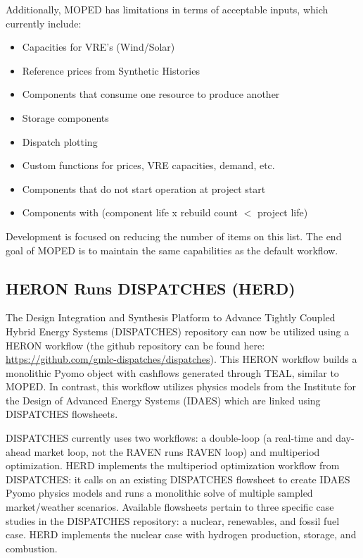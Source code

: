 Additionally, MOPED has limitations in terms of acceptable inputs, which currently include:
\begin{itemize}
    \item Capacities for VRE's (Wind/Solar)
    \item Reference prices from Synthetic Histories
    \item Components that consume one resource to produce another
    \item Storage components
    \item Dispatch plotting
    \item Custom functions for prices, VRE capacities, demand, etc.
    \item Components that do not start operation at project start
    \item Components with (component life x rebuild count $<$ project life)
\end{itemize}
Development is focused on reducing the number of items on this list. The end goal of MOPED is to maintain the same capabilities as the default workflow.

\subsection{HERON Runs DISPATCHES (HERD)}
The Design Integration and Synthesis Platform to Advance Tightly Coupled Hybrid Energy Systems (DISPATCHES) repository can now be utilized using a HERON workflow (the github repository can be found here: \url{https://github.com/gmlc-dispatches/dispatches}). This HERON workflow builds a monolithic Pyomo object with cashflows generated through TEAL, similar to MOPED. In contrast, this workflow utilizes physics models from the Institute for the Design of Advanced Energy Systems (IDAES) which are linked using DISPATCHES flowsheets. 

DISPATCHES currently uses two workflows: a double-loop (a real-time and day-ahead market loop, not the RAVEN runs RAVEN loop) and multiperiod optimization.  HERD implements the multiperiod optimization workflow from DISPATCHES: it calls on an existing DISPATCHES flowsheet to create IDAES Pyomo physics models and runs a monolithic solve of multiple sampled market/weather scenarios. Available flowsheets pertain to three specific case studies in the DISPATCHES repository: a nuclear, renewables, and fossil fuel case. HERD implements the nuclear case with hydrogen production, storage, and combustion. 

